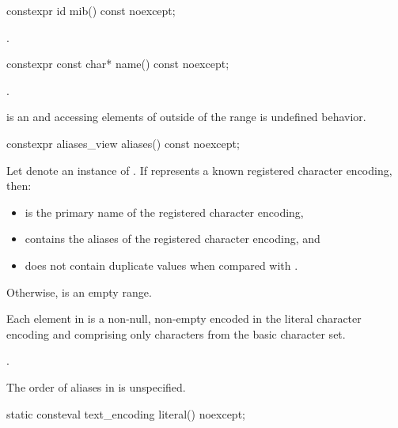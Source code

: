 %
\begin{itemdecl}
constexpr id mib() const noexcept;
\end{itemdecl}

\begin{itemdescr}
\pnum
\returns
{}.
\end{itemdescr}

%
\begin{itemdecl}
constexpr const char* name() const noexcept;
\end{itemdecl}

\begin{itemdescr}
\pnum
\returns
{}.

\pnum
\remarks
{} is an \ntbs{} and
accessing elements of 
outside of the range 
is undefined behavior.
\end{itemdescr}

%
\begin{itemdecl}
constexpr aliases_view aliases() const noexcept;
\end{itemdecl}

\begin{itemdescr}
Let  denote an instance of .
If  represents a known registered character encoding, then:
\begin{itemize}
\item
{} is the primary name of the registered character encoding,
\item
{} contains the aliases of the registered character encoding, and
\item
{} does not contain duplicate values when compared with .
\end{itemize}
Otherwise,  is an empty range.

\pnum
Each element in 
is a non-null, non-empty \ntbs{} encoded in the literal character encoding and
comprising only characters from the basic character set.

\pnum
\returns
{}.

\pnum
\begin{note}
The order of aliases in  is unspecified.
\end{note}
\end{itemdescr}

%
\begin{itemdecl}
static consteval text_encoding literal() noexcept;
\end{itemdecl}

